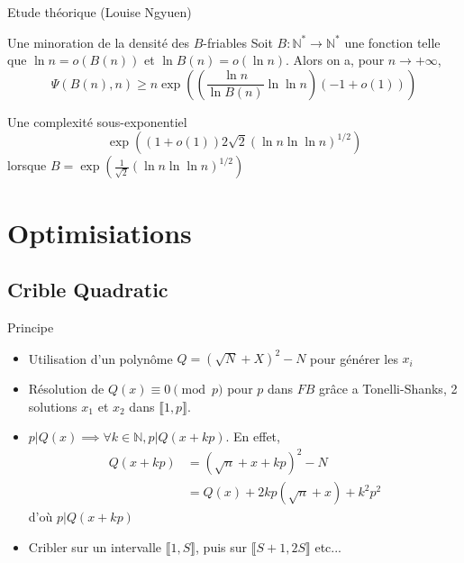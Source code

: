 \documentclass{beamer}
\begin{document}
\begin{frame}{Etude théorique (Louise Ngyuen)}
    \begin{block}{Une minoration de la densité des $B$-friables}
    Soit $B : \mathbb N^\ast \to \mathbb N^\ast$ une fonction telle que $\ln n = o(B(n))$ et $\ln B(n) = o (\ln n)$. Alors on a, pour $n \to +\infty$,
    \[
    \Psi(B(n), n) \ge n\exp\left(\left(\frac {\ln n}{\ln B(n)} \ln \ln n\right)(-1 + o(1))\right)
    \]
    \end{block}
    \begin{block}{Une complexité sous-exponentiel}
    \[
    \exp\left((1+ o(1))2{\sqrt 2} (\ln n \ln \ln n)^{1/2}\right)
    \]
    lorsque $B =\exp\left(\frac 1{\sqrt 2}(\ln n\ln \ln n)^{1/2}\right)$
    \end{block}
\end{frame}

\section{Optimisiations}
\subsection{Crible Quadratic}

\begin{frame}{Principe}
    \begin{itemize}
        \item Utilisation d'un polynôme $Q = (\sqrt N + X)^2 - N$ pour générer les $x_i$
        \item Résolution de $Q(x) \equiv 0 \pmod p$ pour $p$ dans $FB$ grâce a Tonelli-Shanks, 2 solutions $x_1$ et $x_2$ dans $\llbracket 1, p \rrbracket$.
        \item $p|Q(x) \implies \forall k\in \mathbb N,  p|Q(x+kp)$. En effet, 
        \begin{align*}
            Q(x+kp) &= (\sqrt n + x+kp)^2 - N \\
                    &= Q(x) + 2kp(\sqrt n + x) + k^2p^2
        \end{align*}
        d'où $p|Q(x+kp)$
        \item Cribler sur un intervalle $\llbracket 1,S \rrbracket$, puis sur $\llbracket S+1,2S \rrbracket$ etc...
    \end{itemize}
\end{frame}


\end{document}
